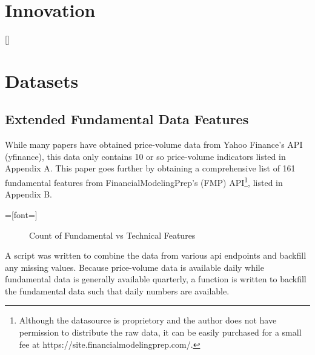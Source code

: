 \documentclass[a4paper,12pt]{report}
\renewcommand\thechapter{\Roman{chapter}}
\numberwithin{equation}{section}
\theoremstyle{definition}
\begin{document}
\chapter{Innovation}

\titleformat{\chapter}[display]{\Large}{\centering
  \MakeUppercase{\chaptername}\quad{\Huge\thechapter}}{0pt}{\titlerule[.5pt]\vspace{10pt}\centering
  \MakeUppercase}[\vspace{10pt}{\titlerule[.5pt]}]%
\titlespacing{\chapter}{0pt}{-80pt}{1cm}%
\renewcommand{\thechapter}{\arabic{chapter}}
\setcounter{chapter}{3}
\chapter{Datasets}
\section{Extended Fundamental Data Features}
While many papers have obtained price-volume data from Yahoo Finance's API (yfinance), this data only contains 10 or so price-volume indicators listed in Appendix A. This paper goes further by obtaining a comprehensive list of 161 fundamental features from FinancialModelingPrep's (FMP) API\footnote{Although the datasource is proprietory and the author does not have permission to distribute the raw data, it can be easily purchased for a small fee at https://site.financialmodelingprep.com/.}, listed in Appendix B. 

=[font=\large]
\begin{figure}[H]
  \centering
    \caption{Count of Fundamental vs Technical Features}
    \label{fund_tec_pie}
  \end{figure}

  A script was written to combine the data from various api endpoints and backfill any missing values. Because price-volume data is available daily while fundamental data is generally available quarterly, a function is written to backfill the fundamental data such that daily numbers are available.
\end{document}
